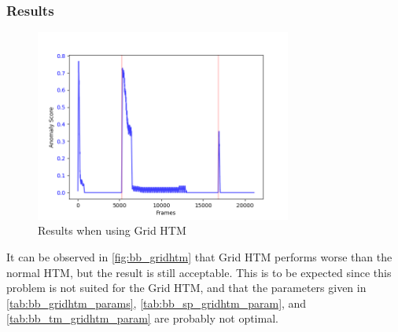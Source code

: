 \subsubsection{Results}
\begin{figure}[H]
    \centering
    \includegraphics[width=0.75\textwidth]{resources/experiments/bouncing_ball/bb_grid.png}
    \caption{Results when using Grid HTM}
    \label{fig:bb_gridhtm}
\end{figure}
It can be observed in \autoref{fig:bb_gridhtm} that Grid HTM performs worse than the normal HTM, but the result is still acceptable. This is to be expected since this problem is not suited for the Grid HTM, and that the parameters given in \autoref{tab:bb_gridhtm_params}, \autoref{tab:bb_sp_gridhtm_param}, and \autoref{tab:bb_tm_gridhtm_param} are probably not optimal.
